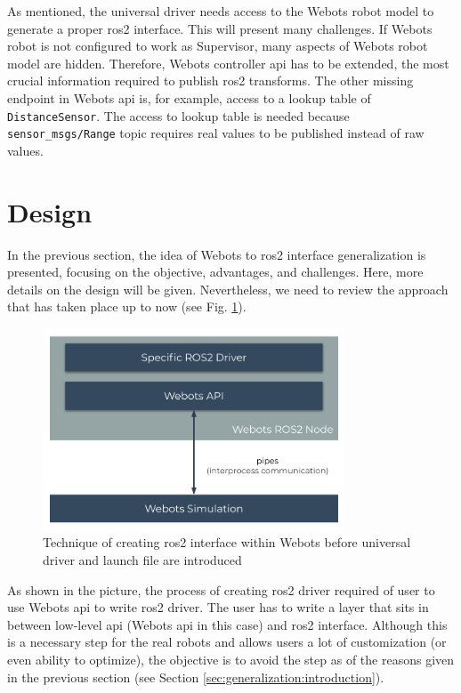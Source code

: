 As mentioned, the universal driver needs access to the Webots robot model to generate a proper \ac{ros2} interface. This will present many challenges. If Webots robot is not configured to work as Supervisor, many aspects of Webots robot model are hidden. Therefore, Webots controller \ac{api} has to be extended, the most crucial information required to publish \ac{ros2} transforms. The other missing endpoint in Webots \ac{api} is, for example, access to a lookup table of \texttt{DistanceSensor}. The access to lookup table is needed because \texttt{sensor\_msgs/Range} topic requires real values to be published instead of raw values.



\section{Design}

In the previous section, the idea of Webots to \ac{ros2} interface generalization is presented, focusing on the objective, advantages, and challenges. Here, more details on the design will be given. Nevertheless, we need to review the approach that has taken place up to now (see Fig. \ref{fig:generalization:ros2_driver_within_webots}). 

\begin{figure}[H]
    \centering
    \includegraphics[width=0.8\textwidth]{generalization/figures/ros2_driver_within_webots.pdf}
    \caption{Technique of creating \ac{ros2} interface within Webots before universal driver and launch file are introduced}
    \label{fig:generalization:ros2_driver_within_webots}
\end{figure}

As shown in the picture, the process of creating \ac{ros2} driver required of user to use Webots \ac{api} to write \ac{ros2} driver. The user has to write a layer that sits in between low-level \ac{api} (Webots \ac{api} in this case) and \ac{ros2} interface. Although this is a necessary step for the real robots and allows users a lot of customization (or even ability to optimize), the objective is to avoid the step as of the reasons given in the previous section (see Section \ref{sec:generalization:introduction}).

